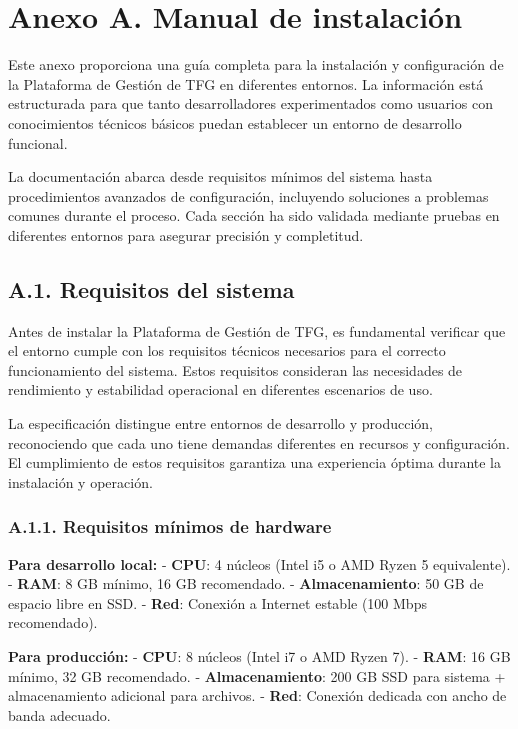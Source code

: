 \documentclass[12pt,a4paper,oneside]{report}
\begin{document}
\chapter{Anexo A. Manual de
instalación}\label{anexo-a.-manual-de-instalaciuxf3n}
Este anexo proporciona una guía completa para la instalación y configuración de la Plataforma de Gestión de TFG en diferentes entornos. La información está estructurada para que tanto desarrolladores experimentados como usuarios con conocimientos técnicos básicos puedan establecer un entorno de desarrollo funcional.

La documentación abarca desde requisitos mínimos del sistema hasta procedimientos avanzados de configuración, incluyendo soluciones a problemas comunes durante el proceso. Cada sección ha sido validada mediante pruebas en diferentes entornos para asegurar precisión y completitud.

\section{A.1. Requisitos del sistema}\label{a.1.-requisitos-del-sistema}

Antes de instalar la Plataforma de Gestión de TFG, es fundamental verificar que el entorno cumple con los requisitos técnicos necesarios para el correcto funcionamiento del sistema. Estos requisitos consideran las necesidades de rendimiento y estabilidad operacional en diferentes escenarios de uso.

La especificación distingue entre entornos de desarrollo y producción, reconociendo que cada uno tiene demandas diferentes en recursos y configuración. El cumplimiento de estos requisitos garantiza una experiencia óptima durante la instalación y operación.

\subsection{A.1.1. Requisitos mínimos de
hardware}\label{a.1.1.-requisitos-muxednimos-de-hardware}

\textbf{Para desarrollo local:} - \textbf{CPU}: 4 núcleos (Intel i5 o
AMD Ryzen 5 equivalente). - \textbf{RAM}: 8 GB mínimo, 16 GB
recomendado. - \textbf{Almacenamiento}: 50 GB de espacio libre en SSD. -
\textbf{Red}: Conexión a Internet estable (100 Mbps recomendado).

\textbf{Para producción:} - \textbf{CPU}: 8 núcleos (Intel i7 o AMD
Ryzen 7). - \textbf{RAM}: 16 GB mínimo, 32 GB recomendado. -
\textbf{Almacenamiento}: 200 GB SSD para sistema + almacenamiento
adicional para archivos. - \textbf{Red}: Conexión dedicada con ancho de
banda adecuado.
\end{document}
